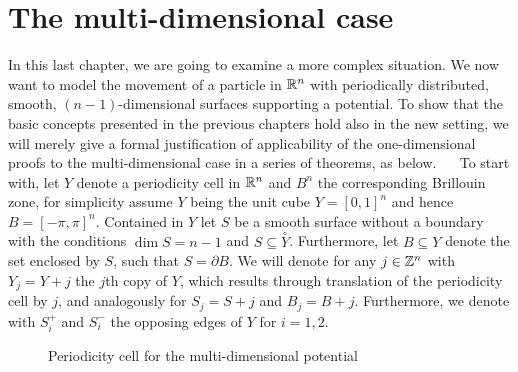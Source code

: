 \chapter{The multi-dimensional case} \label{chap5}

In this last chapter, we are going to examine a more complex situation. We now want to model the movement of a particle in $\mathbb{R}^{n}$ with periodically distributed, smooth, $(n-1)$-dimensional surfaces supporting a potential. To show that the basic concepts presented in the previous chapters hold also in the new setting, we will merely give a formal justification of applicability of the one-dimensional proofs to the multi-dimensional case in a series of theorems, as below.
~\newline ~\newline
To start with, let $Y$ denote a periodicity cell in $\mathbb{R}^{n}$ and $B^{n}$ the corresponding Brillouin zone, for simplicity assume $Y$ being the unit cube $Y = [0, 1]^{n}$ and hence $B = [-\pi, \pi]^{n}$. Contained in $Y$ let $S$ be a smooth surface without a boundary with the conditions $\dim S = n - 1$ and $S \subseteq \overset{\circ}{Y}$. Furthermore, let $B \subseteq Y$ denote the set enclosed by $S$, such that $S = \partial B$. We will denote for any $j \in \mathbb{Z}^{n}$ with $Y_{j} = Y + j$ the $j$th copy of $Y$, which results through translation of the periodicity cell by $j$, and analogously for $S_{j} = S + j$ and $B_{j} = B + j$. Furthermore, we denote with $S_{i}^{+}$ and $S_{i}^{-}$ the opposing edges of $Y$ for $i = 1, 2$.

\begin{figure}[!ht] \centering
	\caption{Periodicity cell for the multi-dimensional potential}
\end{figure}


